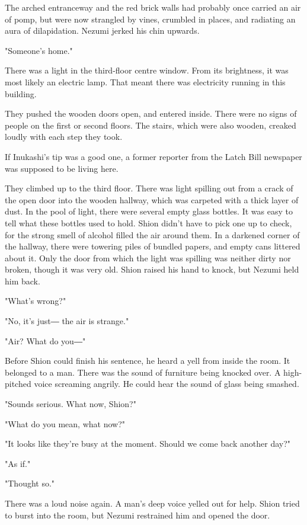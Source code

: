 The arched entranceway and the red brick walls had probably once carried
an air of pomp, but were now strangled by vines, crumbled in places, and
radiating an aura of dilapidation. Nezumi jerked his chin upwards.

"Someone's home."

There was a light in the third-floor centre window. From its brightness,
it was most likely an electric lamp. That meant there was electricity
running in this building.

They pushed the wooden doors open, and entered inside. There were no
signs of people on the first or second floors. The stairs, which were
also wooden, creaked loudly with each step they took.

If Inukashi's tip was a good one, a former reporter from the Latch Bill
newspaper was supposed to be living here.

They climbed up to the third floor. There was light spilling out from a
crack of the open door into the wooden hallway, which was carpeted with
a thick layer of dust. In the pool of light, there were several empty
glass bottles. It was easy to tell what these bottles used to hold.
Shion didn't have to pick one up to check, for the strong smell of
alcohol filled the air around them. In a darkened corner of the hallway,
there were towering piles of bundled papers, and empty cans littered
about it. Only the door from which the light was spilling was neither
dirty nor broken, though it was very old. Shion raised his hand to
knock, but Nezumi held him back.

"What's wrong?"

"No, it's just― the air is strange."

"Air? What do you―"

Before Shion could finish his sentence, he heard a yell from inside the
room. It belonged to a man. There was the sound of furniture being
knocked over. A high-pitched voice screaming angrily. He could hear the
sound of glass being smashed.

"Sounds serious. What now, Shion?"

"What do you mean, what now?"

"It looks like they're busy at the moment. Should we come back another
day?"

"As if."

"Thought so."

There was a loud noise again. A man's deep voice yelled out for help.
Shion tried to burst into the room, but Nezumi restrained him and opened
the door.

